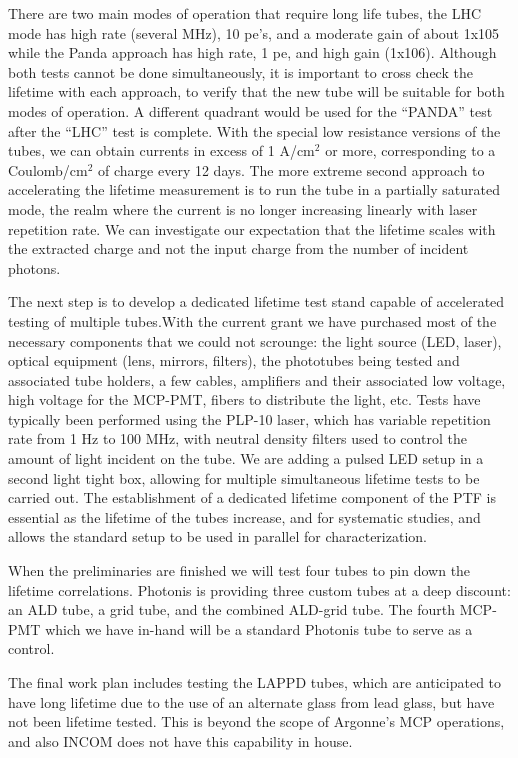 There are two main modes of operation that require long life tubes, the LHC mode has high rate (several MHz), 10 pe's, and a moderate gain of about 1x105  while the Panda approach has high rate, 1 pe, and high gain (1x106). Although both tests cannot be done simultaneously, it is important to cross check the lifetime with each approach, to verify that the new tube will be suitable for both modes of operation. A different quadrant would be used for the ``PANDA'' test after the ``LHC'' test is complete.   With the special low resistance versions of the tubes, we can obtain currents in excess of 1 A/cm$^{2}$ or more, corresponding to a Coulomb/cm$^{2}$ of charge every 12 days. The more extreme second approach to accelerating the lifetime measurement is to run the tube in a partially saturated mode, the realm where the current is no longer increasing linearly with laser repetition rate. We can investigate our expectation that the lifetime scales with the extracted charge and not the input charge from the number of incident photons. 

The next step is to develop a dedicated lifetime test stand capable of accelerated testing of multiple tubes.With the current grant we have purchased most of the necessary components that we could not scrounge: the light source (LED, laser), optical equipment (lens, mirrors, filters), the phototubes being tested and associated tube holders, a few cables, amplifiers and their associated low voltage, high voltage for the MCP-PMT, fibers to distribute the light, etc. Tests have typically been  performed using  the PLP-10 laser, which has variable repetition rate from 1 Hz to 100 MHz, with neutral density filters used to control the amount of light incident on the tube.  We are adding a pulsed LED setup in a second light tight box, allowing for multiple simultaneous lifetime tests to be carried out.  The establishment of a dedicated lifetime component of the PTF is essential as the lifetime of the tubes increase, and for systematic studies, and allows the standard setup to be used in parallel for characterization.

When the preliminaries are finished we will test four tubes to pin down the lifetime correlations. Photonis is providing three custom tubes at a deep discount: an ALD tube, a grid tube, and the combined ALD-grid tube. The fourth MCP-PMT which we have in-hand will be a standard Photonis tube to serve as a control.
 
The final work plan includes testing the LAPPD tubes, which are anticipated to have long lifetime due to the use of an alternate glass from lead glass, but have not been lifetime tested. This is beyond the scope of Argonne's MCP operations, and also INCOM does not have this capability in house. 

